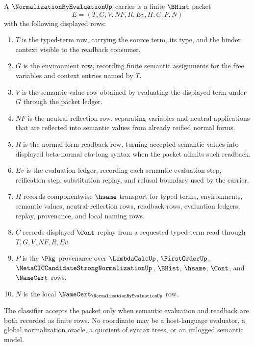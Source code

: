 \begin{definition}
\label{def:normalization-by-evaluation-carrier}
A $\NormalizationByEvaluationUp$ carrier is a finite $\BHist$ packet
$$
E=(T,G,V,NF,R,Ev,H,C,P,N)
$$
with the following displayed rows:
\begin{enumerate}
\item $T$ is the typed-term row, carrying the source term, its type, and the binder context visible to the readback consumer.
\item $G$ is the environment row, recording finite semantic assignments for the free variables and context entries named by $T$.
\item $V$ is the semantic-value row obtained by evaluating the displayed term under $G$ through the packet ledger.
\item $NF$ is the neutral-reflection row, separating variables and neutral applications that are reflected into semantic values from already reified normal forms.
\item $R$ is the normal-form readback row, turning accepted semantic values into displayed beta-normal eta-long syntax when the packet admits such readback.
\item $Ev$ is the evaluation ledger, recording each semantic-evaluation step, reification step, substitution replay, and refusal boundary used by the carrier.
\item $H$ records componentwise $\hsame$ transport for typed terms, environments, semantic values, neutral-reflection rows, readback rows, evaluation ledgers, replay, provenance, and local naming rows.
\item $C$ records displayed $\Cont$ replay from a requested typed-term read through $T,G,V,NF,R,Ev$.
\item $P$ is the $\Pkg$ provenance over $\LambdaCalcUp$, $\FirstOrderUp$, $\MetaCICCandidateStrongNormalizationUp$, $\BHist$, $\hsame$, $\Cont$, and $\NameCert$ rows.
\item $N$ is the local $\NameCert_{\NormalizationByEvaluationUp}$ row.
\end{enumerate}
The classifier accepts the packet only when semantic evaluation and readback are both recorded as finite rows. No coordinate may be a host-language evaluator, a global normalization oracle, a quotient of syntax trees, or an unlogged semantic model.
\end{definition}

